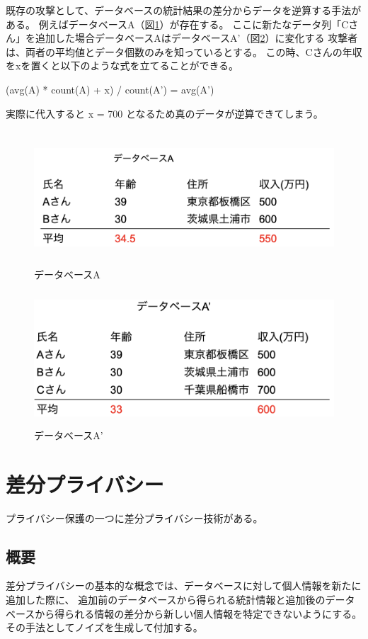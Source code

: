 \documentclass[a4paper,11pt]{jreport}
\begin{document}
既存の攻撃として、データベースの統計結果の差分からデータを逆算する手法がある。
例えばデータベースA（図\ref{fig:database-a}）が存在する。
ここに新たなデータ列「Cさん」を追加した場合データベースAはデータベースA'（図\ref{fig:database-a2}）に変化する
攻撃者は、両者の平均値とデータ個数のみを知っているとする。
この時、Cさんの年収をxを置くと以下のような式を立てることができる。

(avg(A) * count(A) + x) / count(A') = avg(A')

実際に代入すると x = 700 となるため真のデータが逆算できてしまう。

\begin{figure}[htbp]
    \centering
\includegraphics[height=50mm]{database-a.png}
    \caption{データベースA}
    \label{fig:database-a}
\end{figure}

\begin{figure}[htbp]
    \centering
\includegraphics[height=50mm]{database-a2.png}
    \caption{データベースA'}
    \label{fig:database-a2}
\end{figure}

\section{差分プライバシー}
プライバシー保護の一つに差分プライバシー技術がある。\cite{dp}

\subsection{概要}
差分プライバシーの基本的な概念では、データベースに対して個人情報を新たに追加した際に、
追加前のデータベースから得られる統計情報と追加後のデータベースから得られる情報の差分から新しい個人情報を特定できないようにする。
その手法としてノイズを生成して付加する。
\end{document}
